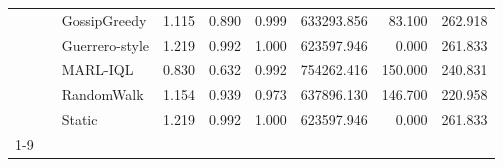 \begin{table}
\begin{tabular}{lllrrrrrr}
 &  & GossipGreedy & 1.115 & 0.890 & 0.999 & 633293.856 & 83.100 & 262.918 \\
 &  & Guerrero-style & 1.219 & 0.992 & 1.000 & 623597.946 & 0.000 & 261.833 \\
 &  & MARL-IQL & 0.830 & 0.632 & 0.992 & 754262.416 & 150.000 & 240.831 \\
 &  & RandomWalk & 1.154 & 0.939 & 0.973 & 637896.130 & 146.700 & 220.958 \\
 &  & Static & 1.219 & 0.992 & 1.000 & 623597.946 & 0.000 & 261.833 \\
\cline{1-9} \cline{2-9}
\bottomrule
\end{tabular}
\end{table}
